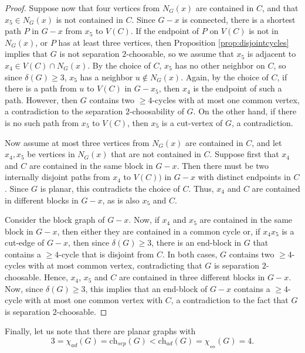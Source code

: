 \documentclass[12pt]{article}
\newcommand{\single}{\chi_{\nleftrightarrow}}
\newcommand{\ch}{\mathrm{ch}}
\begin{document}
\begin{proof}
Suppose now that four vertices from $N_G(x)$ are contained in $C$,
and that $x_5 \in N_G(x)$ is not contained in $C$.
Since $G-x$ is connected, there is a shortest path $P$ in $G-x$ from
$x_5$ to $V(C)$. If the endpoint of $P$ on $V(C)$ is not in $N_G(x)$,
or $P$ has at least three vertices, then Proposition \ref{prop:disjointcycles}
implies that $G$ is not separation $2$-choosable, so we assume
that $x_5$ is adjacent to $x_4 \in V(C) \cap N_G(x)$. 
By the choice of $C$, 
$x_5$ has no other neighbor on $C$, so since $\delta(G) \geq 3$,
$x_5$ has a neighbor $u \notin N_G(x)$. Again, by the choice
of $C$, if there is a path from $u$ to $V(C)$ in $G-x_5$, then
$x_4$ is the endpoint of such a path. However, then $G$ contains two $\geq 4$-cycles with
at most one common vertex, a contradiction to the separation $2$-choosability of $G$.
On the other hand, if there is no such path from $x_5$ to $V(C)$,
then $x_5$ is a cut-vertex of $G$, a contradiction.

Now assume at most three vertices from $N_G(x)$ are contained in $C$,
and let $x_4,x_5$ be vertices in $N_G(x)$ that are not contained in
$C$. Suppose first that $x_4$ and $C$ are contained in the same
block in $G-x$. Then there must be two internally disjoint paths from $x_4$ to $V(C))$ in $G-x$
with distinct endpoints in $C$. Since $G$ is planar,
this contradicts the choice
of $C$. Thus, $x_4$ and $C$ are contained in different blocks in $G-x$,
as is also $x_5$ and $C$. 

Consider the block graph of $G-x$. %
Now, if $x_4$ and $x_5$ are contained in the same block in $G-x$, then
either they are contained in a common cycle or, if $x_4x_5$
is a cut-edge of $G-x$, then since $\delta(G) \geq 3$, 
there is an end-block
in $G$ that contains a $\geq 4$-cycle that is disjoint from $C$. 
In both cases, $G$ contains 
two $\geq 4$-cycles with at most common vertex, 
contradicting that $G$ is
separation $2$-choosable. Hence, $x_4$, $x_5$ and $C$ are contained in
three different blocks in $G - x$. Now, since $\delta(G) \geq 3$, this 
implies that an end-block of $G-x$ contains a 
$\geq 4$-cycle with at most one
common vertex with $C$, a contradiction to the fact that $G$ is
separation $2$-choosable.
\end{proof}



\bigskip

	Finally, let us note that there are planar graphs with 
	$$3=\chi_{ad}(G) =\ch_{sep}(G) < \ch_{ad}(G) = \single(G) =4.$$ 
\end{document}
